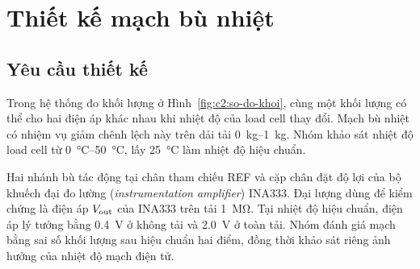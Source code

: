 \chapter{Thiết kế mạch bù nhiệt}
\label{chap:c4}

\section{Yêu cầu thiết kế}
\label{sec:c4:yeu-cau}

Trong hệ thống đo khối lượng ở Hình~\ref{fig:c2:so-do-khoi}, cùng một
khối lượng có thể cho hai điện áp khác nhau khi nhiệt độ của load cell
thay đổi. Mạch bù nhiệt có nhiệm vụ giảm chênh lệch này trên dải tải
\qtyrange{0}{1}{\kilo\gram}. Nhóm khảo sát nhiệt độ load cell từ
\qtyrange{0}{50}{\celsius}, lấy \qty{25}{\celsius} làm nhiệt độ hiệu chuẩn.

Hai nhánh bù tác động tại chân tham chiếu REF và cặp chân đặt độ lợi
của bộ khuếch đại đo lường (\textit{instrumentation amplifier}) INA333.
Đại lượng dùng để kiểm chứng là điện áp $V_{\mathrm{out}}$ của INA333 trên tải
\qty{1}{\mega\ohm}. Tại nhiệt độ hiệu chuẩn, điện áp lý tưởng bằng
\qty{0.4}{\volt} ở không tải và \qty{2.0}{\volt} ở toàn tải.
Nhóm đánh giá mạch bằng sai số khối lượng sau hiệu chuẩn hai điểm,
đồng thời khảo sát riêng ảnh hưởng của nhiệt độ mạch điện tử.


